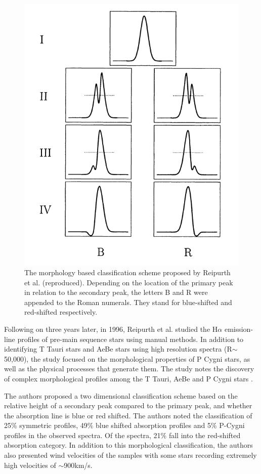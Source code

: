 \begin{figure}[!htb]
\centering
\includegraphics[scale=1]{figures/reipurth classes.png}
\caption{The morphology based classification scheme proposed by Reipurth et al. (reproduced). Depending on the location of the primary peak in relation to the secondary peak, the letters B and R were appended to the Roman numerals. They stand for blue-shifted and red-shifted respectively.}
\end{figure}

Following on three years later, in 1996, Reipurth et al. studied the H$\alpha$ emission-line profiles of pre-main sequence stars using manual methods. In addition to identifying T Tauri stars and AeBe stars using high resolution spectra (R$\sim$50,000), the study focused on the morphological properties of P Cygni stars, as well as the physical processes that generate them. The study notes the discovery of complex morphological profiles among the T Tauri, AeBe and P Cygni stars \citep{reipurth1996halpha}.

The authors proposed a two dimensional classification scheme based on the relative height of a secondary peak compared to the primary peak, and whether the absorption line is blue or red shifted. The authors noted the classification of 25\% symmetric profiles, 49\% blue shifted absorption profiles and 5\% P-Cygni profiles in the observed spectra. Of the spectra, 21\% fall into the red-shifted absorption category. In addition to this morphological classification, the authors also presented wind velocities of the samples with some stars recording extremely high velocities of $\sim$900km/s. 

